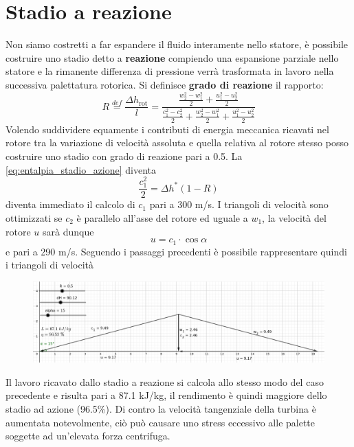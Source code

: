 \documentclass[a4paper,12pt]{article}
\begin{document}
\section{Stadio a reazione}
\label{sec:stadio_a_reazione}
Non siamo costretti a far espandere il fluido interamente nello statore, è possibile costruire uno stadio detto a \textbf{reazione} compiendo una espansione parziale
nello statore e la rimanente differenza di pressione verrà trasformata in lavoro nella successiva palettatura rotorica.
Si definisce \textbf{grado di reazione} il rapporto:
\begin{equation}
    \label{eq:grado_di_reazione}
    R \stackrel{def}{=} \frac{\Delta h_{\text{rot}}}{l} = \frac{\frac{w_2^2-w_1^2}{2} + \frac{u_1^2 - u_2^2}{2} }  %
                                                                {\frac{c_1^2-c_2^2}{2} + \frac{w_2^2-w_1^2}{2} + \frac{u_1^2 - u_2^2}{2}}  %
\end{equation}
Volendo suddividere equamente i contributi di energia meccanica ricavati nel rotore tra la variazione di velocità assoluta e quella relativa al rotore stesso
posso costruire uno stadio con grado di reazione pari a 0.5.
La \eqref{eq:entalpia_stadio_azione} diventa
\begin{equation}
    \frac{c_1^2}{2} = \Delta h^* (1-R)
\end{equation}
diventa immediato il calcolo di $c_1$ pari a 300 m/s.
I triangoli di velocità sono ottimizzati se $c_2$ è parallelo all'asse del rotore ed uguale a $w_1$, la velocità del rotore $u$ sarà dunque
\begin{equation}
    u = c_1 \cdot \cos \alpha
\end{equation}
e pari a 290 m/s.
Seguendo i passaggi precedenti è possibile rappresentare quindi i triangoli di velocità
\begin{figure}[H]
    \label{fig:triangoli_reazione}
    \centering
    \includegraphics[width=\linewidth]{media/triangoli_reazione.png}
\end{figure}
Il lavoro ricavato dallo stadio a reazione si calcola allo stesso modo del caso precedente e risulta pari a 87.1 kJ/kg, il rendimento è quindi maggiore dello stadio
ad azione (96.5\%). Di contro la velocità tangenziale della turbina è aumentata notevolmente, ciò può causare uno stress eccessivo alle palette soggette ad un'elevata
forza centrifuga.
\end{document}
